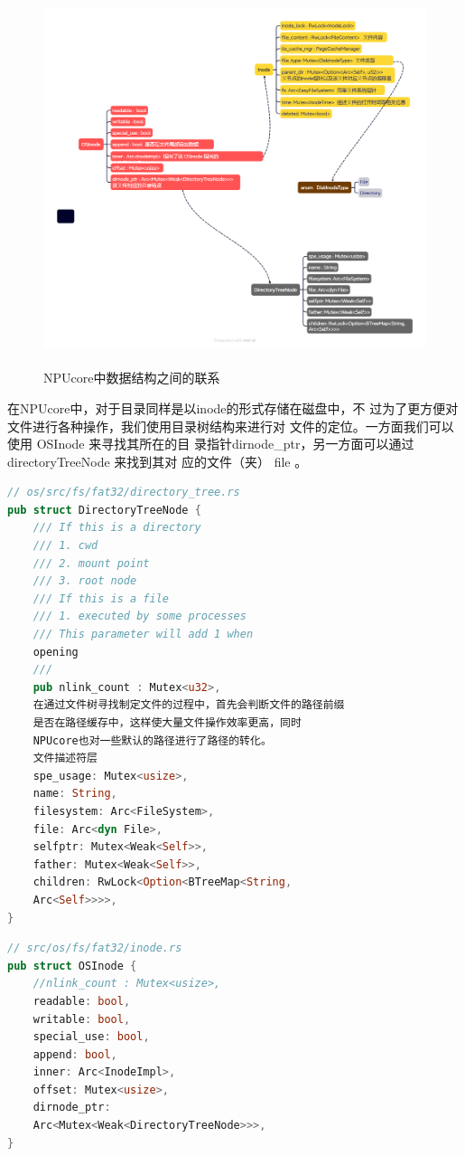 \begin{figure}[H]
	\centering
	\includegraphics[width=14cm,height=11cm]{figures/07-05-NPUcore中数据结构之间的联系.png}
	\caption{NPUcore中数据结构之间的联系}
\end{figure} 

在NPUcore中，对于目录同样是以inode的形式存储在磁盘中，不
过为了更方便对文件进行各种操作，我们使用目录树结构来进行对
文件的定位。一方面我们可以使用 OSInode 来寻找其所在的目
录指针dirnode\_ptr，另一方面可以通过 directoryTreeNode 来找到其对
应的文件（夹） file 。

\begin{lstlisting}[language=Rust]
// os/src/fs/fat32/directory_tree.rs
pub struct DirectoryTreeNode {
	/// If this is a directory
	/// 1. cwd
	/// 2. mount point
	/// 3. root node
	/// If this is a file
	/// 1. executed by some processes
	/// This parameter will add 1 when
	opening
	///
	pub nlink_count : Mutex<u32>,
	在通过文件树寻找制定文件的过程中，首先会判断文件的路径前缀
	是否在路径缓存中，这样使大量文件操作效率更高，同时
	NPUcore也对一些默认的路径进行了路径的转化。
	文件描述符层
	spe_usage: Mutex<usize>,
	name: String,
	filesystem: Arc<FileSystem>,
	file: Arc<dyn File>,
	selfptr: Mutex<Weak<Self>>,
	father: Mutex<Weak<Self>>,
	children: RwLock<Option<BTreeMap<String,
	Arc<Self>>>>,
}
\end{lstlisting}

\begin{lstlisting}[language=Rust]
// src/os/fs/fat32/inode.rs
pub struct OSInode {
	//nlink_count : Mutex<usize>,
	readable: bool,
	writable: bool,
	special_use: bool,
	append: bool,
	inner: Arc<InodeImpl>,
	offset: Mutex<usize>,
	dirnode_ptr:
	Arc<Mutex<Weak<DirectoryTreeNode>>>,
}
\end{lstlisting}

